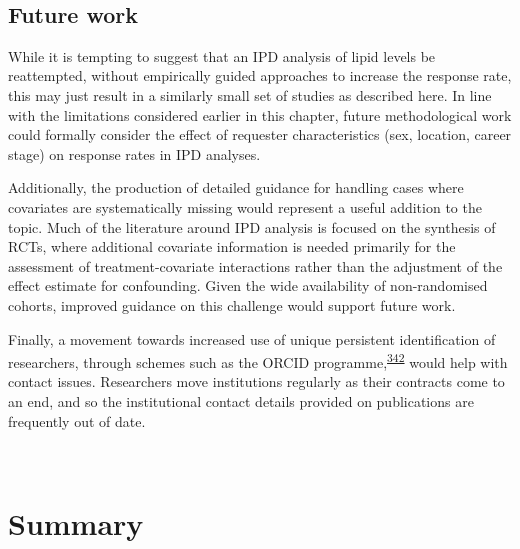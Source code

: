 \documentclass[a4paper, twoside]{templates/ociamthesis}
\begin{document}
~

\hypertarget{future-work}{%
\subsection{Future work}\label{future-work}}

While it is tempting to suggest that an IPD analysis of lipid levels be reattempted, without empirically guided approaches to increase the response rate, this may just result in a similarly small set of studies as described here. In line with the limitations considered earlier in this chapter, future methodological work could formally consider the effect of requester characteristics (sex, location, career stage) on response rates in IPD analyses.

Additionally, the production of detailed guidance for handling cases where covariates are systematically missing would represent a useful addition to the topic. Much of the literature around IPD analysis is focused on the synthesis of RCTs, where additional covariate information is needed primarily for the assessment of treatment-covariate interactions rather than the adjustment of the effect estimate for confounding. Given the wide availability of non-randomised cohorts, improved guidance on this challenge would support future work.

Finally, a movement towards increased use of unique persistent identification of researchers, through schemes such as the ORCID programme,\textsuperscript{\protect\hyperlink{ref-nature2009}{342}} would help with contact issues. Researchers move institutions regularly as their contracts come to an end, and so the institutional contact details provided on publications are frequently out of date.

~

\hypertarget{summary-5}{%
\section{Summary}\label{summary-5}}
\end{document}
